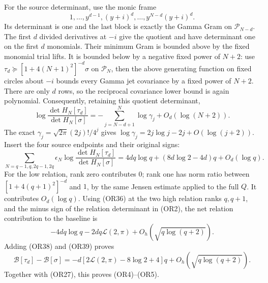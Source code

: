 \documentclass[11pt]{article}
\newcommand{\PP}{\mathcal P}
\newcommand{\BB}{\mathcal B}
\begin{document}
For the source determinant, use the monic frame
\[
 1,\ldots,y^{d-1},(y+i)^d,\ldots,y^{N-d}(y+i)^d .
\]
Its determinant is one and the last block is exactly the Gamma
Gram on \(\PP_{N-d}\).
The first \(d\) divided derivatives at \(-i\) give the quotient
and have determinant one on the first \(d\) monomials.
Their minimum Gram is bounded above by the fixed monomial
trial lifts.  It is bounded below by a negative fixed power
of \(N+2\): use
\(\tau_d\succeq[1+4(N+1)^2]^{-d}\sigma\) on \(\PP_N\),
then the above generating function on fixed circles about
\(-i\) bounds every Gamma jet covariance by a fixed power
of \(N+2\).  There are only \(d\) rows, so the reciprocal
covariance lower bound is again polynomial.
Consequently, retaining this quotient determinant,
\[
 \log\frac{\det H_N[\tau_d]}{\det H_N[\sigma]}
 =-\sum_{j=N-d+1}^N\log\gamma_j+O_d(\log(N+2)).       \tag{OR37}
\]
The exact \(\gamma_j=\sqrt{2\pi}(2j)!/4^j\) gives
\(\log\gamma_j=2j\log j-2j+O(\log(j+2))\).
Insert the four source endpoints and their original signs:
\[
 \sum_{N=q-1,q,2q-1,2q}\epsilon_N
 \log\frac{\det H_N[\tau_d]}{\det H_N[\sigma]}
 =4dq\log q+(8d\log2-4d)q+O_d(\log q).              \tag{OR38}
\]
For the low relation, rank zero contributes \(0\); rank one
has norm ratio between \([1+4(q+1)^2]^{-d}\) and \(1\), by
the same Jensen estimate applied to the full \(Q\).
It contributes \(O_d(\log q)\).
Using (OR36) at the two high relation ranks \(q,q+1\),
and the minus sign of the relation determinant in (OR2),
the net relation contribution to the baseline is
\[
 -4dq\log q-2dq\mathcal L(2,\pi)
 +O_h(\sqrt{q\log(q+2)}).                            \tag{OR39}
\]
Adding (OR38) and (OR39) proves
\[
 \BB[\tau_d]-\BB[\sigma]
 =-d[2\mathcal L(2,\pi)-8\log2+4]q
 +O_h(\sqrt{q\log(q+2)}).                            \tag{OR40}
\]
Together with (OR27), this proves (OR4)--(OR5).
\end{document}
